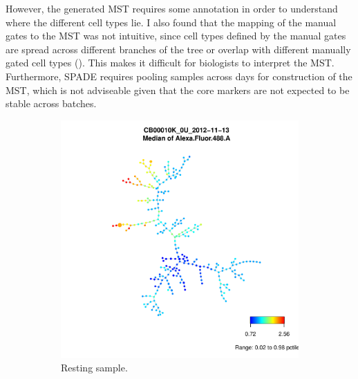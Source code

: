 However, the generated \gls{MST} requires some annotation in order to understand where the different cell types lie.
I also found that the mapping of the manual gates to the MST was not intuitive,
since cell types defined by the manual gates are spread across different branches of the tree
or overlap with different manually gated cell types ().
This makes it difficult for biologists to interpret the \gls{MST}.
Furthermore, SPADE requires pooling samples across days for construction of the \gls{MST}, which is not adviseable given that the core
markers are not expected to be stable across batches.

\begin{figure}[h]
  \centering
\begin{subfigure}[b]{.4\textwidth}
  \includegraphics[scale=.4]{IL2/figures/CB00010K-0U-2012-11-13-spade.pdf}
\caption{Resting sample.}
\end{subfigure}
\begin{subfigure}[b]{.4\textwidth}

\end{subfigure}
\end{figure}
